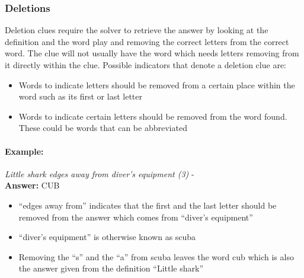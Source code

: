 \subsubsection{Deletions}

Deletion clues require the solver to retrieve the answer by looking at the
definition and the word play and removing the correct letters from the correct
word. The clue will not usually have the word which needs letters removing from
it directly within the clue. Possible indicators that denote a deletion clue
are:

\begin{itemize}
    \item Words to indicate letters should be removed from a certain place 
    within the word such as its first or last letter 
    \item Words to indicate certain letters should be removed from the word 
    found. These could be words that can be abbreviated 
\end{itemize}

\paragraph{Example:} \emph{Little shark edges away from diver's equipment (3)}  - \citep{shuchiDeletions09} \\
\textbf{Answer:} CUB 

\begin{itemize}
    \item ``edges away from'' indicates that the first and the last letter 
    should be removed from the answer which comes from ``diver’s equipment''
    \item ``diver’s equipment'' is otherwise known as scuba  
    \item Removing the ``s'' and the ``a'' from scuba leaves the word cub which
    is also the answer given from the definition ``Little shark''
\end{itemize}
